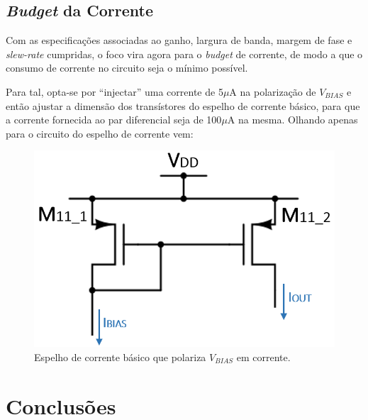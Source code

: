 \documentclass[11pt]{article}
\numberwithin{equation}{section}
\begin{document}
\subsection{\textit{Budget} da Corrente}

Com as especificações associadas ao ganho, largura de banda, margem de fase e \textit{slew-rate} cumpridas, o foco vira agora para o \textit{budget} de corrente, de modo a que o consumo de corrente no circuito seja o mínimo possível.

Para tal, opta-se por ``injectar'' uma corrente de 5$\mu$A na polarização de $V_{BIAS}$ e então ajustar a dimensão dos transístores do espelho de corrente básico, para que a corrente fornecida ao par diferencial seja de 100$\mu$A na mesma. Olhando apenas para o circuito do espelho de corrente vem:

\begin{figure}[H]
	\centering
	\includegraphics[keepaspectratio=true, scale=0.45]{teoricas/cmirror}
	\vspace{-0.5em}
	\caption{Espelho de corrente básico que polariza $V_{BIAS}$ em corrente.}
	\vspace{-0.8em}
\end{figure}




\pagebreak

\section{Conclusões}

\pagebreak

\listoftodos[Notes]
\end{document}
